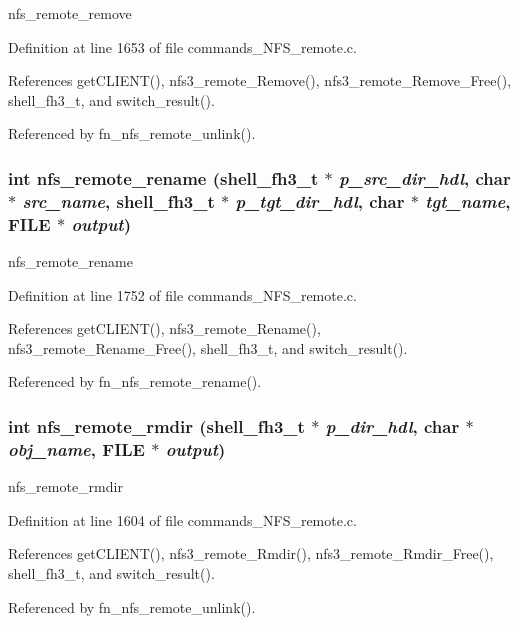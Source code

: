 nfs\_\-remote\_\-remove 

Definition at line 1653 of file commands\_\-NFS\_\-remote.c.

References get\-CLIENT(), nfs3\_\-remote\_\-Remove(), nfs3\_\-remote\_\-Remove\_\-Free(), shell\_\-fh3\_\-t, and switch\_\-result().

Referenced by fn\_\-nfs\_\-remote\_\-unlink().
\subsubsection{\setlength{\rightskip}{0pt plus 5cm}int nfs\_\-remote\_\-rename ({\bf shell\_\-fh3\_\-t} $\ast$ {\em p\_\-src\_\-dir\_\-hdl}, char $\ast$ {\em src\_\-name}, {\bf shell\_\-fh3\_\-t} $\ast$ {\em p\_\-tgt\_\-dir\_\-hdl}, char $\ast$ {\em tgt\_\-name}, FILE $\ast$ {\em output})}\label{commands__NFS__remote_8c_a53}


nfs\_\-remote\_\-rename 

Definition at line 1752 of file commands\_\-NFS\_\-remote.c.

References get\-CLIENT(), nfs3\_\-remote\_\-Rename(), nfs3\_\-remote\_\-Rename\_\-Free(), shell\_\-fh3\_\-t, and switch\_\-result().

Referenced by fn\_\-nfs\_\-remote\_\-rename().
\subsubsection{\setlength{\rightskip}{0pt plus 5cm}int nfs\_\-remote\_\-rmdir ({\bf shell\_\-fh3\_\-t} $\ast$ {\em p\_\-dir\_\-hdl}, char $\ast$ {\em obj\_\-name}, FILE $\ast$ {\em output})}\label{commands__NFS__remote_8c_a50}


nfs\_\-remote\_\-rmdir 

Definition at line 1604 of file commands\_\-NFS\_\-remote.c.

References get\-CLIENT(), nfs3\_\-remote\_\-Rmdir(), nfs3\_\-remote\_\-Rmdir\_\-Free(), shell\_\-fh3\_\-t, and switch\_\-result().

Referenced by fn\_\-nfs\_\-remote\_\-unlink().
